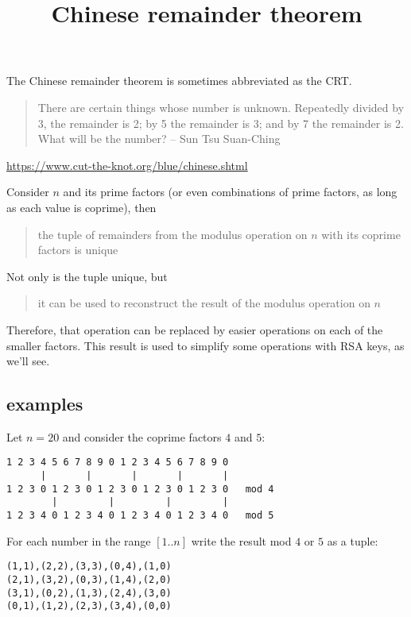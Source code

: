 \documentclass[11pt, oneside]{article}
\title{Chinese remainder theorem}
\date{}
\begin{document}
\maketitle
\Large

The Chinese remainder theorem is sometimes abbreviated as the CRT.

\begin{quote}There are certain things whose number is unknown. Repeatedly divided by 3, the remainder is 2; by 5 the remainder is 3; and by 7 the remainder is 2. What will be the number?  -- Sun Tsu Suan-Ching\end{quote}

\url{https://www.cut-the-knot.org/blue/chinese.shtml}

Consider $n$ and its prime factors (or even combinations of prime factors, as long as each value is coprime), then

\begin{quote}the tuple of remainders from the modulus operation on $n$ with its coprime factors is unique\end{quote}

Not only is the tuple unique, but 

\begin{quote}it can be used to reconstruct the result of the modulus operation on $n$\end{quote}
    
Therefore, that operation can be replaced by easier operations on each of the smaller factors.  This result is used to simplify some operations with RSA keys, as we'll see.

\subsection*{examples}
Let $n = 20$ and consider the coprime factors $4$ and $5$:

\begin{verbatim}
1 2 3 4 5 6 7 8 9 0 1 2 3 4 5 6 7 8 9 0
      |       |       |       |       | 
1 2 3 0 1 2 3 0 1 2 3 0 1 2 3 0 1 2 3 0   mod 4
        |         |         |         |
1 2 3 4 0 1 2 3 4 0 1 2 3 4 0 1 2 3 4 0   mod 5
\end{verbatim}
  
For each number in the range $[1..n]$ write the result mod $4$ or $5$ as a tuple:

\begin{verbatim}
(1,1),(2,2),(3,3),(0,4),(1,0)
(2,1),(3,2),(0,3),(1,4),(2,0)
(3,1),(0,2),(1,3),(2,4),(3,0)
(0,1),(1,2),(2,3),(3,4),(0,0)
\end{verbatim}
\end{document}
